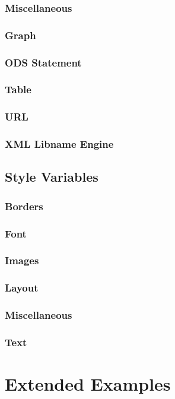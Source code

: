 \documentclass{book}
\begin{document}
\begin{appendix}
\subsection{Miscellaneous}
\subsection{Graph}
\subsection{ODS Statement}
\subsection{Table}
\subsection{URL}
\subsection{XML Libname Engine}
\section{Style Variables}
\subsection{Borders}
\subsection{Font}
\subsection{Images}
\subsection{Layout}
\subsection{Miscellaneous}
\subsection{Text}
\chapter{Extended Examples}
\end{appendix}
\end{document}
